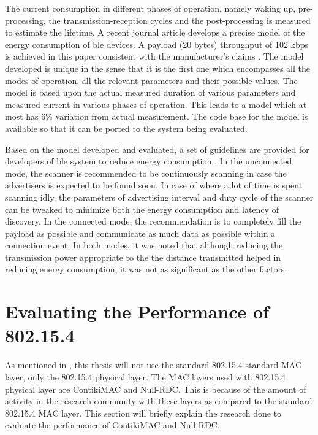 The current consumption in different phases of operation, namely waking up, pre-processing, the transmission-reception cycles and the post-processing is measured \cite{Mackensen2012} to estimate the lifetime. A recent journal article \cite{Kindt2014} develops a precise model of the energy consumption of \gls{ble} devices. A payload (20 bytes) throughput of 102 kbps is achieved in this paper consistent with the manufacturer's claims \cite{MikkoSavolainen}. The model developed is  unique in the sense that it is the first one which encompasses all the modes of operation, all the relevant parameters and their possible values. The model is based upon the actual measured duration of various parameters and measured current in various phases of operation. This leads to a model which at most has 6\% variation from actual measurement. The code base for the model is available so that it can be ported to the system being evaluated.

Based on the model developed and evaluated, a set of guidelines are provided for developers of \gls{ble} system to reduce energy consumption \cite{Kindt2014}. In the unconnected mode, the scanner is recommended to be continuously scanning in case the advertisers is expected to be found soon. In case of where a lot of time is spent scanning idly, the parameters of advertising interval and duty cycle of the scanner can be tweaked to minimize both the energy consumption and latency of discovery. In the connected mode, the recommendation is to completely fill the payload as possible and communicate as much data as possible within a connection event. In both modes, it was noted that although reducing the transmission power appropriate to the the distance transmitted helped in reducing energy consumption, it was not as significant as the other factors.

\section{Evaluating the Performance of 802.15.4} \label{4802}

As mentioned in , this thesis will not use the standard 802.15.4 standard MAC layer, only the 802.15.4 physical layer. The MAC layers used with 802.15.4 physical layer are ContikiMAC and Null-RDC. This is because of the amount of activity in the research community with these layers as compared to the standard 802.15.4 MAC layer. This section will briefly explain the research done to evaluate the performance of ContikiMAC and Null-RDC. 

